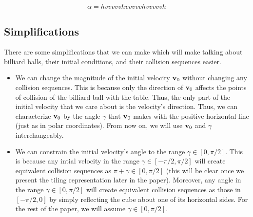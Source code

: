 \begin{eqnarray}
  \alpha = hvvvvvhvvvvvhvvvvvh
\end{eqnarray}

\subsection{Simplifications}

There are some simplifications that we can make which will make talking about billiard balls, their initial conditions, and their collision sequences easier.

\begin{itemize}
  \item We can change the magnitude of the initial velocity $\mathbf{v}_0$ without changing any collision sequences. This is because only the direction of $\mathbf{v}_0$ affects the points of collision of the billiard ball with the table. Thus, the only part of the initial velocity that we care about is the velocity's direction. Thus, we can characterize $\mathbf{v}_0$ by the angle $\gamma$ that $\mathbf{v}_0$ makes with the positive horizontal line (just as in polar coordinates). From now on, we will use $\mathbf{v}_0$ and $\gamma$ interchangeably.
  \item We can constrain the initial velocity's angle to the range $\gamma \in [0, \pi/2]$. This is because any intial velocity in the range $\gamma \in [-\pi/2, \pi/2]$ will create equivalent collision sequences as $\pi + \gamma \in [0, \pi/2]$ (this will be clear once we present the tiling representation later in the paper). Moreover, any angle in the range $\gamma \in [0, \pi/2]$ will create equivalent collision sequences as those in $[-\pi/2, 0]$ by simply reflecting the cube about one of its horizontal sides. For the rest of the paper, we will assume $\gamma \in [0, \pi/2]$.
\end{itemize}
